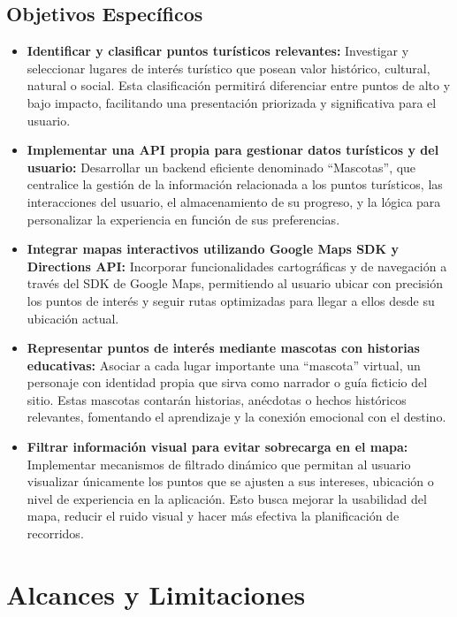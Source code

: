 \documentclass[12pt]{article}
\begin{document}
\subsection{Objetivos Específicos}

\begin{itemize}
    \item \textbf{Identificar y clasificar puntos turísticos relevantes:} 
    Investigar y seleccionar lugares de interés turístico que posean valor histórico, cultural, natural o social. Esta clasificación permitirá diferenciar entre puntos de alto y bajo impacto, facilitando una presentación priorizada y significativa para el usuario.

    \item \textbf{Implementar una API propia para gestionar datos turísticos y del usuario:} 
    Desarrollar un backend eficiente denominado “Mascotas”, que centralice la gestión de la información relacionada a los puntos turísticos, las interacciones del usuario, el almacenamiento de su progreso, y la lógica para personalizar la experiencia en función de sus preferencias.

    \item \textbf{Integrar mapas interactivos utilizando Google Maps SDK y Directions API:} 
    Incorporar funcionalidades cartográficas y de navegación a través del SDK de Google Maps, permitiendo al usuario ubicar con precisión los puntos de interés y seguir rutas optimizadas para llegar a ellos desde su ubicación actual.

    \item \textbf{Representar puntos de interés mediante mascotas con historias educativas:} 
    Asociar a cada lugar importante una “mascota” virtual, un personaje con identidad propia que sirva como narrador o guía ficticio del sitio. Estas mascotas contarán historias, anécdotas o hechos históricos relevantes, fomentando el aprendizaje y la conexión emocional con el destino.

    \item \textbf{Filtrar información visual para evitar sobrecarga en el mapa:} 
    Implementar mecanismos de filtrado dinámico que permitan al usuario visualizar únicamente los puntos que se ajusten a sus intereses, ubicación o nivel de experiencia en la aplicación. Esto busca mejorar la usabilidad del mapa, reducir el ruido visual y hacer más efectiva la planificación de recorridos.
\end{itemize}

\section{Alcances y Limitaciones}
\end{document}
